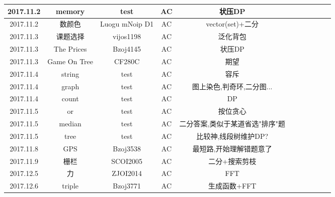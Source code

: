 \documentclass[landscape]{article}
\begin{document}
\begin{longtable}{ccccccccccc}
  \hline
  2017.11.2 & memory & test & AC & 状压DP\\
  \hline
  2017.11.2 & 数颜色 & Luogu mNoip D1 & AC & vector(set)+二分\\
  \hline
  2017.11.3 & 课题选择 & vijos1198 & AC & 泛化背包\\
  \hline
  2017.11.3 & The Prices & Bzoj4145 & AC & 状压DP\\
  \hline
  2017.11.3 & Game On Tree & CF280C & AC & 期望\\
  \hline
  2017.11.4 & string & test & AC & 容斥\\
  \hline
  2017.11.4 & graph & test & AC & 图上染色,判奇环,二分图...\\
  \hline
  2017.11.4 & count & test & AC & DP\\
  \hline
  2017.11.5 & or & test & AC & 按位贪心\\
  \hline
  2017.11.5 & median & test & AC & 二分答案,类似于某道省选"排序"题\\
  \hline
  2017.11.5 & tree & test & AC & 比较神,线段树维护DP?\\
  \hline
  2017.11.8 & GPS & Bzoj3538 & AC & 最短路,开始理解错题意了\\
  \hline
  2017.11.9 & 栅栏 & SCOI2005 & AC & 二分+搜索剪枝\\
  \hline
  2017.12.5 & 力 & ZJOI2014 & AC & FFT\\
  \hline
  2017.12.6 & triple & Bzoj3771 & AC & 生成函数+FFT\\
  \hline
  
\end{longtable}
\end{document}
